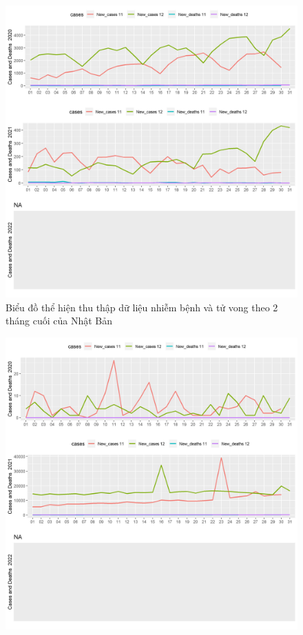 \documentclass[a4paper]{article}
\theoremstyle{definition}
\begin{document}
\begin{enumerate}[i)]
\begin{enumerate}[1)]
\begin{figure}[htp]
		    \includegraphics[scale = 0.7]{Images/V/v6 Japan .jpeg}
		    \caption{Biểu đồ thể hiện thu thập dữ liệu nhiễm bệnh và tử vong theo 2 tháng cuối của Nhật Bản}
		    \label{fig:my_label}
		\end{figure}
		\begin{figure}[htp]
		    \centering
		    \includegraphics[scale = 0.7]{Images/V/v6 Vietnam .jpeg}

\end{figure}
\end{enumerate}
\end{enumerate}
\end{document}

